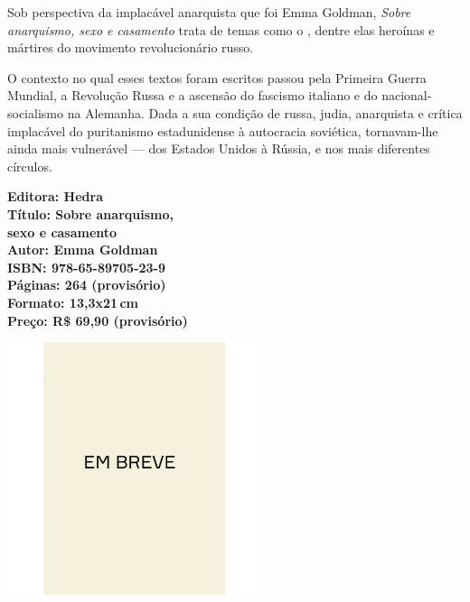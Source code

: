 \noindent{}Sob perspectiva da implacável anarquista que foi Emma Goldman, \textit{Sobre anarquismo, sexo e casamento} trata de temas como o , dentre elas heroínas e mártires do movimento revolucionário russo. 

O contexto no qual esses textos foram escritos passou pela Primeira Guerra Mundial, a Revolução Russa e a ascensão do fascismo italiano e do nacional-socialismo na Alemanha. Dada a sua condição de russa, judia, anarquista e crítica implacável do puritanismo estadunidense à autocracia soviética, tornavam-lhe ainda mais vulnerável --- dos Estados Unidos à Rússia, e nos mais diferentes círculos.

\vfill
\noindent\begin{minipage}[c]{.5\linewidth}
{\small\textbf{
\hspace*{-.1cm}Editora: Hedra\\
Título: Sobre anarquismo,\\sexo e casamento\\
Autor: Emma Goldman\\ 
ISBN: 978-65-89705-23-9\\
Páginas: 264 (provisório)\\
Formato: 13,3x21\,cm\\
Preço: R\$ 69,90 (provisório)\\
}}
\end{minipage}
\pagebreak

\begin{center}
\hspace*{-3.6cm}
\hspace*{3.1cm}\includegraphics[width=74mm]{./CAPAS/BREVE.jpg}
\end{center}
\hspace*{-7cm}\hrulefill\hspace*{-7cm}
\medskip

